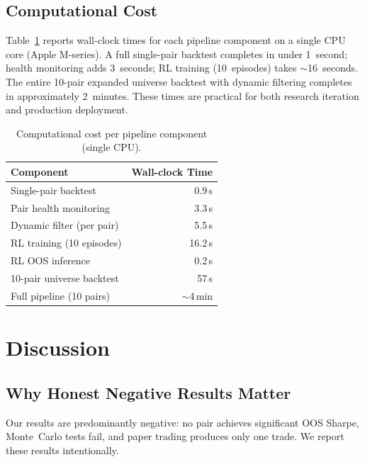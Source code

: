 \documentclass{ieeeaccess}
\begin{document}
\subsection{Computational Cost}
\label{sec:computational_cost}

Table~\ref{tab:computational_cost} reports wall-clock times for each pipeline component on a single CPU core (Apple M-series).
A full single-pair backtest completes in under 1~second; health monitoring adds 3~seconds; RL training (10~episodes) takes $\sim$16~seconds.
The entire 10-pair expanded universe backtest with dynamic filtering completes in approximately 2~minutes.
These times are practical for both research iteration and production deployment.

\begin{table}[h]
\centering
\caption{Computational cost per pipeline component (single CPU).}
\label{tab:computational_cost}
\begin{tabular}{lr}
\hline
\textbf{Component} & \textbf{Wall-clock Time} \\
\hline
Single-pair backtest     & 0.9\,s \\
Pair health monitoring   & 3.3\,s \\
Dynamic filter (per pair)& 5.5\,s \\
RL training (10 episodes)& 16.2\,s \\
RL OOS inference         & 0.2\,s \\
10-pair universe backtest& 57\,s \\
Full pipeline (10 pairs) & $\sim$4\,min \\
\hline
\end{tabular}
\end{table}

\section{Discussion}
\label{sec:discussion}

\subsection{Why Honest Negative Results Matter}

Our results are predominantly negative: no pair achieves significant OOS Sharpe, Monte~Carlo tests fail, and paper trading produces only one trade.
We report these results intentionally.
\end{document}
